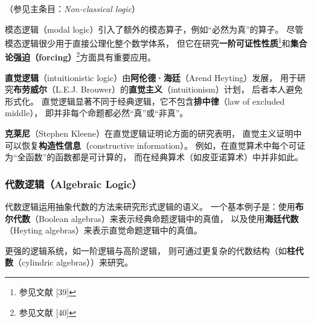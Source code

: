 （参见主条目：\textit{Non-classical logic}）

模态逻辑（modal logic）引入了额外的模态算子，例如“必然为真”的算子。
尽管模态逻辑很少用于直接公理化整个数学体系，
但它在研究\textbf{一阶可证性性质}\footnote{参见文献 [39]}和\textbf{集合论强迫（forcing）}\footnote{参见文献 [40]}方面具有重要应用。

\textbf{直觉逻辑}（intuitionistic logic）由\textbf{阿伦德·海廷}（Arend Heyting）发展，
用于研究\textbf{布劳威尔}（L.E.J. Brouwer）的\textbf{直觉主义}（intuitionism）计划，
后者本人避免形式化。  
直觉逻辑显著不同于经典逻辑，它不包含\textbf{排中律}（law of excluded middle），
即并非每个命题都必然“真”或“非真”。

\textbf{克莱尼}（Stephen Kleene）在直觉逻辑证明论方面的研究表明，
直觉主义证明中可以恢复\textbf{构造性信息}（constructive information）。  
例如，在直觉算术中每个可证为“全函数”的函数都是可计算的，
而在经典算术（如皮亚诺算术）中并非如此。

\subsubsection{代数逻辑（Algebraic Logic）}

代数逻辑运用抽象代数的方法来研究形式逻辑的语义。  
一个基本例子是：使用\textbf{布尔代数}（Boolean algebras）来表示经典命题逻辑中的真值，  
以及使用\textbf{海廷代数}（Heyting algebras）来表示直觉命题逻辑中的真值。  

更强的逻辑系统，如一阶逻辑与高阶逻辑，
则可通过更复杂的代数结构（如\textbf{柱代数}（cylindric algebras））来研究。
